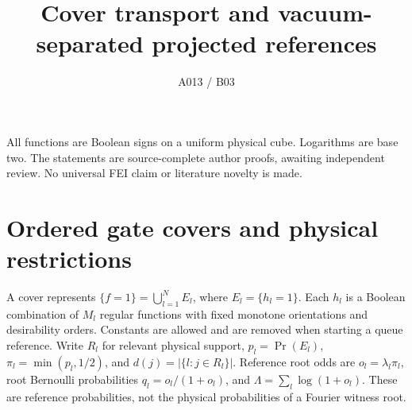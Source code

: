 \documentclass{article}
\begin{document}
\title{Cover transport and vacuum-separated projected references}
\author{A013 / B03}\maketitle
All functions are Boolean signs on a uniform physical cube. Logarithms
are base two. The statements are source-complete author proofs, awaiting
independent review. No universal FEI claim or literature novelty is made.

\section{Ordered gate covers and physical restrictions}
A cover represents $\{f=1\}=\bigcup_{l=1}^N E_l$, where $E_l=\{h_l=1\}$.
Each $h_l$ is a Boolean combination of $M_l$ regular functions with fixed
monotone orientations and desirability orders. Constants are allowed and
are removed when starting a queue reference. Write $R_l$ for relevant
physical support, $p_l=\Pr(E_l)$, $\pi_l=\min(p_l,1/2)$, and
$d(j)=|\{l:j\in R_l\}|$. Reference root odds are $o_l=\lambda_l\pi_l$,
root Bernoulli probabilities $q_l=o_l/(1+o_l)$, and
$\Lambda=\sum_l\log(1+o_l)$. These are reference probabilities, not the
physical probabilities of a Fourier witness root.
\end{document}
